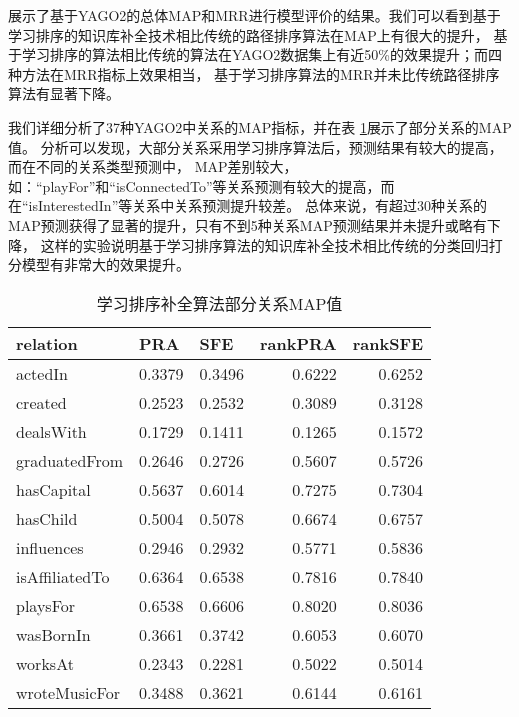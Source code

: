 展示了基于YAGO2的总体MAP和MRR进行模型评价的结果。我们可以看到基于学习排序的知识库补全技术相比传统的路径排序算法在MAP上有很大的提升，
基于学习排序的算法相比传统的算法在YAGO2数据集上有近50\%的效果提升；而四种方法在MRR指标上效果相当，
基于学习排序算法的MRR并未比传统路径排序算法有显著下降。

我们详细分析了37种YAGO2中关系的MAP指标，并在表 \ref{rank}展示了部分关系的MAP值。
分析可以发现，大部分关系采用学习排序算法后，预测结果有较大的提高，而在不同的关系类型预测中，
MAP差别较大，如：“playFor”和“isConnectedTo”等关系预测有较大的提高，而在“isInterestedIn”等关系中关系预测提升较差。
总体来说，有超过30种关系的MAP预测获得了显著的提升，只有不到5种关系MAP预测结果并未提升或略有下降，
这样的实验说明基于学习排序算法的知识库补全技术相比传统的分类回归打分模型有非常大的效果提升。


\begin{table}[htbp]
  \centering
  \caption{学习排序补全算法部分关系MAP值}
    \begin{tabular}{|l|r|r|r|r|}
    \hline
    relation & \multicolumn{1}{l|}{PRA} & \multicolumn{1}{l|}{SFE} & \multicolumn{1}{l|}{rankPRA} & \multicolumn{1}{l|}{rankSFE} \\
    \hline
    actedIn & 0.3379  & 0.3496  & 0.6222  & 0.6252  \\
    \hline
    created & 0.2523  & 0.2532  & 0.3089  & 0.3128  \\
    \hline
    dealsWith & 0.1729  & 0.1411  & 0.1265  & 0.1572  \\
    \hline
    graduatedFrom & 0.2646  & 0.2726  & 0.5607  & 0.5726  \\
    \hline
    hasCapital & 0.5637  & 0.6014  & 0.7275  & 0.7304  \\
    \hline
    hasChild & 0.5004  & 0.5078  & 0.6674  & 0.6757  \\
    \hline
    influences & 0.2946  & 0.2932  & 0.5771  & 0.5836  \\
    \hline
    isAffiliatedTo & 0.6364  & 0.6538  & 0.7816  & 0.7840  \\
    \hline
    playsFor & 0.6538  & 0.6606  & 0.8020  & 0.8036  \\
    \hline
    wasBornIn & 0.3661  & 0.3742  & 0.6053  & 0.6070  \\
    \hline
    worksAt & 0.2343  & 0.2281  & 0.5022  & 0.5014  \\
    \hline
    wroteMusicFor & 0.3488  & 0.3621  & 0.6144  & 0.6161  \\
    \hline
    \end{tabular}%
  \label{rank}%
\end{table}%





